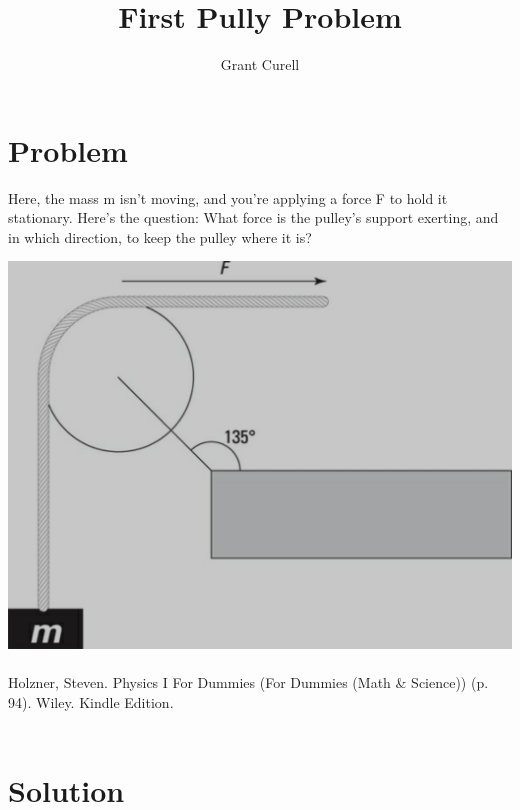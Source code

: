 \documentclass{article}
\title{First Pully Problem}
\author{Grant Curell}
\begin{document}
\maketitle{}
\section{Problem}
Here, the mass m isn’t moving, and you’re applying a force F to hold it stationary. Here’s the question: What force is the pulley’s support exerting, and in which direction, to keep the pulley where it is?

\includegraphics[width=\columnwidth]{image}
\\\\
Holzner, Steven. Physics I For Dummies (For Dummies (Math \& Science)) (p. 94). Wiley. Kindle Edition.
\\\\
\section{Solution}
\end{document}
